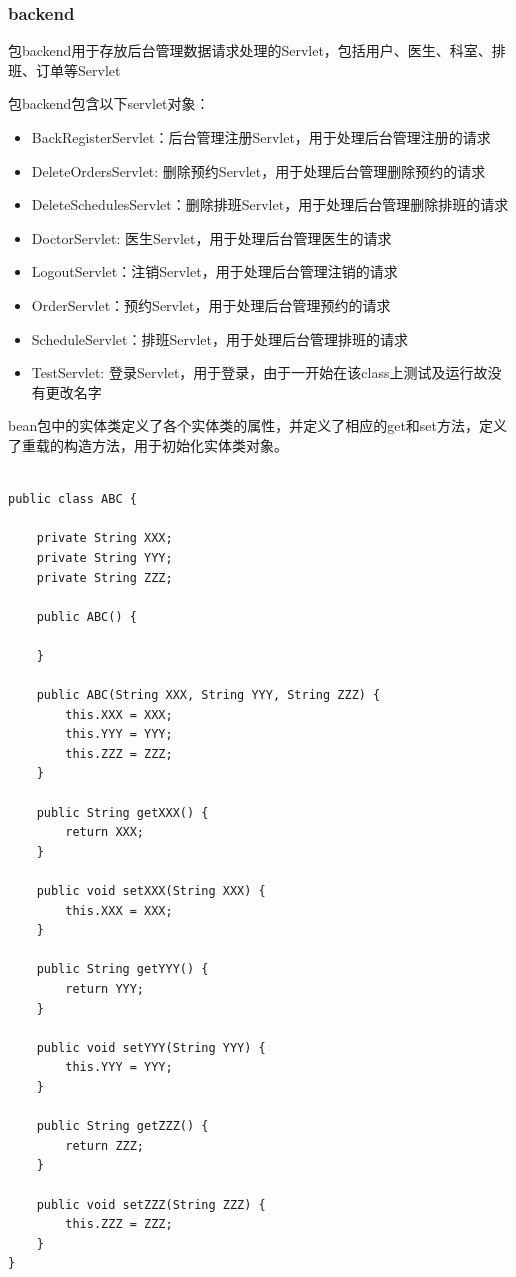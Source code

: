 \documentclass[UTF8,12pt]{article}
\begin{document}
\subsubsection{backend}
包backend用于存放后台管理数据请求处理的Servlet，包括用户、医生、科室、排班、订单等Servlet

包backend包含以下servlet对象：

\begin{itemize}
    \item BackRegisterServlet：后台管理注册Servlet，用于处理后台管理注册的请求
    \item DeleteOrdersServlet: 删除预约Servlet，用于处理后台管理删除预约的请求
    \item DeleteSchedulesServlet：删除排班Servlet，用于处理后台管理删除排班的请求
    \item DoctorServlet: 医生Servlet，用于处理后台管理医生的请求
    \item LogoutServlet：注销Servlet，用于处理后台管理注销的请求
    \item OrderServlet：预约Servlet，用于处理后台管理预约的请求
    \item ScheduleServlet：排班Servlet，用于处理后台管理排班的请求
    \item TestServlet: 登录Servlet，用于登录，由于一开始在该class上测试及运行故没有更改名字
\end{itemize}

bean包中的实体类定义了各个实体类的属性，并定义了相应的get和set方法，定义了重载的构造方法，用于初始化实体类对象。

\begin{lstlisting}[frame=shadowbox]

public class ABC {
    
    private String XXX;
    private String YYY;
    private String ZZZ;

    public ABC() {

    }

    public ABC(String XXX, String YYY, String ZZZ) {
        this.XXX = XXX;
        this.YYY = YYY;
        this.ZZZ = ZZZ;
    }

    public String getXXX() {
        return XXX;
    }

    public void setXXX(String XXX) {
        this.XXX = XXX;
    }

    public String getYYY() {
        return YYY;
    }

    public void setYYY(String YYY) {
        this.YYY = YYY;
    }

    public String getZZZ() {
        return ZZZ;
    }

    public void setZZZ(String ZZZ) {
        this.ZZZ = ZZZ;
    }
}

\end{lstlisting}
\end{document}
